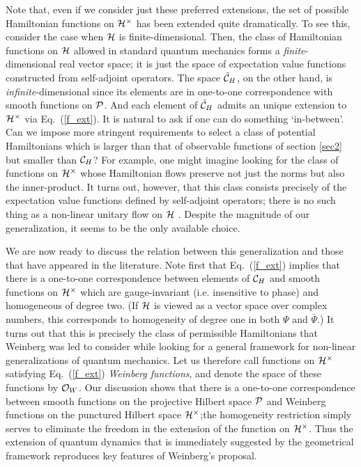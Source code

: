 \documentclass[12pt,aps,eqsecnum,tighten]{revtex4-2}
\def\H{{\cal H}}
\def\punctH{{\cal H}^{\times}}
\def\P{{\cal P}}
\def\ch{{\cal C}_H}
\begin{document}
Note that, even if we consider just these preferred extensions, the
set of possible Hamiltonian functions on $\punctH$ has been extended
quite dramatically.  To see this, consider the case when $\H$ is
finite-dimensional. Then, the class of Hamiltonian functions on $\H$
allowed in standard quantum mechanics forms a {\it finite}-dimensional
real vector space; it is just the space of expectation value functions
constructed from self-adjoint operators. The space $\tilde\ch$, on the
other hand, is {\it infinite}-dimensional since its elements are in
one-to-one correspondence with smooth functions on $\P$. And each
element of $\tilde\ch$ admits an unique extension to $\punctH$ via
Eq.~(\ref{f_ext}). It is natural to ask if one can do something
`in-between'. Can we impose more stringent requirements to select a
class of potential Hamiltonians which is larger than that of
observable functions of section \ref{sec2} but smaller than $\ch$?
For example, one might imagine looking for the class of functions on
$\punctH$ whose Hamiltonian flows preserve not just the norms but also
the inner-product. It turns out, however, that this class consists
precisely of the expectation value functions defined by self-adjoint
operators; there is no such thing as a non-linear unitary flow on $\H$
\cite{thesis}. Despite the magnitude of our generalization, it seems
to be the only available choice.

We are now ready to discuss the relation between this generalization
and those that have appeared in the literature. Note first that
Eq.~(\ref{f_ext}) implies that there is a one-to-one correspondence
between elements of $\ch$ and smooth functions on $\punctH$ which are
gauge-invariant (i.e. insensitive to phase) and homogeneous of degree
two. (If $\H$ is viewed as a vector space over complex numbers, this
corresponds to homogeneity of degree one in both $\Psi$ and
$\bar{\Psi}$.)  It turns out that this is precisely the class of
permissible Hamiltonians that Weinberg \cite{weinberg} was led to
consider while looking for a general framework for non-linear
generalizations of quantum mechanics. Let us therefore call functions
on $\punctH$ satisfying Eq.~(\ref{f_ext}) {\em Weinberg functions},
and denote the space of these functions by ${\cal O}_W$. Our
discussion shows that there is a one-to-one correspondence between
smooth functions on the projective Hilbert space $\P$ and Weinberg
functions on the punctured Hilbert space $\punctH$;the homogeneity
restriction simply serves to eliminate the freedom in the extension of
the function on $\punctH$.  Thus the extension of quantum dynamics
that is immediately suggested by the geometrical framework reproduces
key features of Weinberg's proposal.
\end{document}
